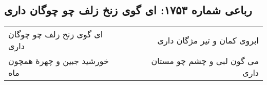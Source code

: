 \begin{center}
\section*{رباعی شماره ۱۷۵۳: ای گوی زنخ زلف چو چوگان داری}
\label{sec:1753}
\begin{longtable}{l p{0.5cm} r}
ای گوی زنخ زلف چو چوگان داری
&&
ابروی کمان و تیر مژگان داری
\\
خورشید جبین و چهرهٔ همچون ماه
&&
می گون لبی و چشم چو مستان داری
\\
\end{longtable}
\end{center}
